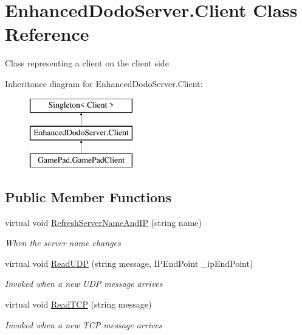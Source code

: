 \hypertarget{class_enhanced_dodo_server_1_1_client}{}\section{Enhanced\+Dodo\+Server.\+Client Class Reference}
\label{class_enhanced_dodo_server_1_1_client}


Class representing a client on the client side  


Inheritance diagram for Enhanced\+Dodo\+Server.\+Client\+:\begin{figure}[H]
\begin{center}
\leavevmode
\includegraphics[height=3.000000cm]{class_enhanced_dodo_server_1_1_client}
\end{center}
\end{figure}
\subsection*{Public Member Functions}
\begin{DoxyCompactItemize}
\item 
virtual void \mbox{\hyperlink{class_enhanced_dodo_server_1_1_client_ad033acbfece943136bd6e7aed5cfdc8c}{Refresh\+Server\+Name\+And\+IP}} (string name)
\begin{DoxyCompactList}\small\item\em When the server name changes \end{DoxyCompactList}\item 
virtual void \mbox{\hyperlink{class_enhanced_dodo_server_1_1_client_ab3e43c3998a31c73e1f3c0f98d0bf2e9}{Read\+U\+DP}} (string message, I\+P\+End\+Point \+\_\+ip\+End\+Point)
\begin{DoxyCompactList}\small\item\em Invoked when a new U\+DP message arrives \end{DoxyCompactList}\item 
virtual void \mbox{\hyperlink{class_enhanced_dodo_server_1_1_client_a17cf05d7a5f727e7eda92659dbba30a0}{Read\+T\+CP}} (string message)
\begin{DoxyCompactList}\small\item\em Invoked when a new T\+CP message arrives \end{DoxyCompactList}\end{DoxyCompactItemize}
